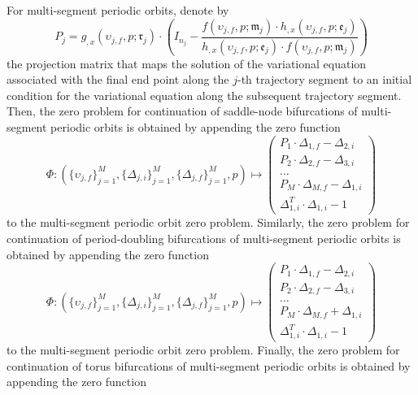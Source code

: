 For multi-segment periodic orbits, denote by
\begin{equation}
P_j=g_{,x}(\upsilon_{j,f},p;\mathfrak{r}_j)\cdot\left(I_{n_j}-\frac{f(\upsilon_{j,f},p;\mathfrak{m}_j)\cdot h_{,x}(\upsilon_{j,f},p;\mathfrak{e}_j)}{ h_{,x}(\upsilon_{j,f},p;\mathfrak{e}_j)\cdot f(\upsilon_{j,f},p;\mathfrak{m}_j)}\right)
\end{equation}
the projection matrix that maps the solution of the variational equation associated with the final end point along the $j$-th trajectory segment to an initial condition for the variational equation along the subsequent trajectory segment. Then, the zero problem for continuation of saddle-node bifurcations of multi-segment periodic orbits is obtained by appending the zero function
\begin{equation}
\Phi:\left(\{\upsilon_{j,f}\}_{j=1}^M,\{\Delta_{j,i}\}_{j=1}^M,\{\Delta_{j,f}\}_{j=1}^M,p\right)\mapsto\left(\begin{array}{c}P_1\cdot\Delta_{1,f}-\Delta_{2,i}\\P_2\cdot\Delta_{2,f}-\Delta_{3,i}\\\ldots\\P_M\cdot\Delta_{M,f}-\Delta_{1,i}\\\Delta_{1,i}^T\cdot\Delta_{1,i}-1\end{array}\right)
\end{equation}
to the multi-segment periodic orbit zero problem. Similarly, the zero problem for continuation of period-doubling bifurcations of multi-segment periodic orbits is obtained by appending the zero function \begin{equation}
\Phi:\left(\{\upsilon_{j,f}\}_{j=1}^M,\{\Delta_{j,i}\}_{j=1}^M,\{\Delta_{j,f}\}_{j=1}^M,p\right)\mapsto\left(\begin{array}{c}P_1\cdot\Delta_{1,f}-\Delta_{2,i}\\P_2\cdot\Delta_{2,f}-\Delta_{3,i}\\\ldots\\P_M\cdot\Delta_{M,f}+\Delta_{1,i}\\\Delta_{1,i}^T\cdot\Delta_{1,i}-1\end{array}\right)
\end{equation}
to the multi-segment periodic orbit zero problem. Finally, the zero problem for continuation of torus bifurcations of multi-segment periodic orbits is obtained by appending the zero function
